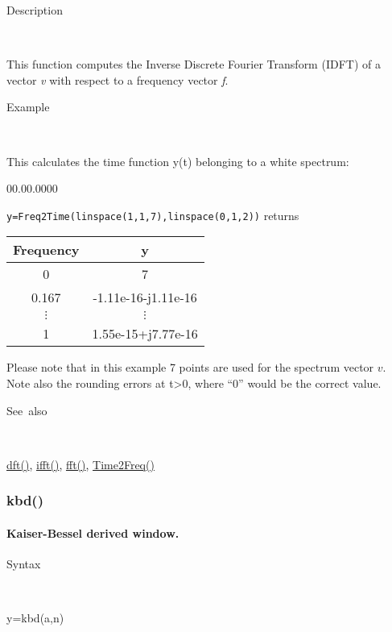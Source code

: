 \begin{description}
\item [Description]~
\end{description}
This function computes the Inverse Discrete Fourier Transform (IDFT)
of a vector \textit{v} with respect to a frequency vector \textit{f}.

\begin{description}
\item [Example]~
\end{description}
This calculates the time function y(t) belonging to a white spectrum:

\begin{lyxlist}{00.00.0000}
\item [\texttt{y=Freq2Time(linspace(1,1,7),linspace(0,1,2))}]returns\\

\begin{tabular}{|c|c|}
\hline 
Frequency&
y\tabularnewline
\hline
\hline 
0&
7\tabularnewline
\hline 
0.167&
-1.11e-16-j1.11e-16\tabularnewline
\hline 
$\vdots$&
$\vdots$\tabularnewline
\hline 
1&
1.55e-15+j7.77e-16\tabularnewline
\hline
\end{tabular}
\end{lyxlist}
Please note that in this example 7 points are used for the spectrum
vector $v$.  Note also the rounding errors at t>0, where {}``0'' would
be the correct value.

\begin{description}
\item [See~also]~
\end{description}
\textcolor{blue}{\hyperlink{dft}{dft()}}\textcolor{black}{,} \textcolor{blue}{\hyperlink{ifft}{ifft()}}\textcolor{black}{,}
\textcolor{blue}{\hyperlink{fft}{fft()}}\textcolor{black}{,}
\textcolor{blue}{\hyperlink{Time2Freq}{Time2Freq()}}

\newpage
\subsubsection*{\hypertarget{kbd}{}{\Large kbd()}}


\paragraph{\label{par:Kaiser-Bessel-window}Kaiser-Bessel derived window.}

\begin{description}
\item [Syntax]~
\end{description}
y=kbd(a,n)

